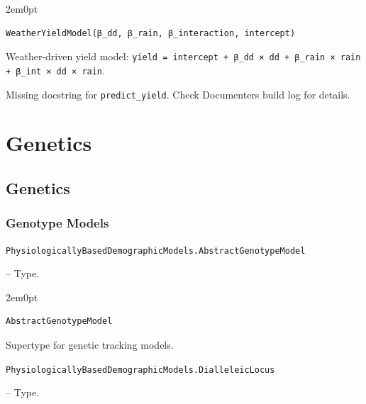 \begin{adjustwidth}{2em}{0pt}


\begin{verbatim}
WeatherYieldModel(β_dd, β_rain, β_interaction, intercept)
\end{verbatim}

Weather-driven yield model: \texttt{yield = intercept + β\_dd × dd + β\_rain × rain + β\_int × dd × rain}.



\end{adjustwidth}

\begin{tcolorbox}[toptitle=-1mm,bottomtitle=1mm,colback=admonition-warning!50!white,colframe=admonition-warning,title=\textbf{Missing docstring.}]
Missing docstring for \texttt{predict\_yield}. Check Documenter{\textquotesingle}s build log for details.

\end{tcolorbox}


\chapter{Genetics}


\section{Genetics}



\label{9082729394151769948}{}


\subsection{Genotype Models}



\label{13382811227613602272}{}

\hypertarget{7271285238182846442}{\texttt{PhysiologicallyBasedDemographicModels.AbstractGenotypeModel}}  -- {Type.}

\begin{adjustwidth}{2em}{0pt}


\begin{verbatim}
AbstractGenotypeModel
\end{verbatim}

Supertype for genetic tracking models.



\end{adjustwidth}
\hypertarget{9017946769294875070}{\texttt{PhysiologicallyBasedDemographicModels.DialleleicLocus}}  -- {Type.}

